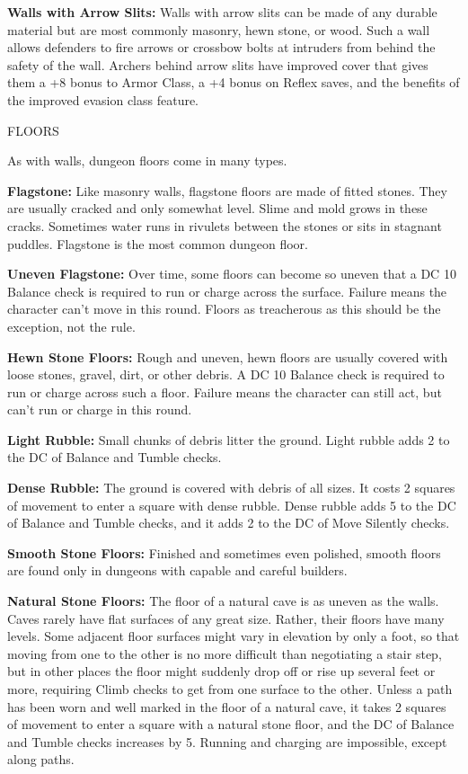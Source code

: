 \documentclass{article}
\begin{document}
\textbf{Walls with Arrow Slits: }Walls with arrow slits can be made of any durable 
material but are most commonly masonry, hewn stone, or wood. Such a wall allows 
defenders to fire arrows or crossbow bolts at intruders from behind the safety 
of the wall. Archers behind arrow slits have improved cover that gives them a +8 
bonus to Armor Class, a +4 bonus on Reflex saves, and the benefits of the improved 
evasion class feature.

\vspace{12pt}
FLOORS

As with walls, dungeon floors come in many types.

\textbf{Flagstone: }Like masonry walls, flagstone floors are made of fitted stones. 
They are usually cracked and only somewhat level. Slime and mold grows in these 
cracks. Sometimes water runs in rivulets between the stones or sits in stagnant 
puddles. Flagstone is the most common dungeon floor.

\textbf{Uneven Flagstone:} Over time, some floors can become so uneven that a DC 
10 Balance check is required to run or charge across the surface. Failure means 
the character can't move in this round. Floors as treacherous as this should be 
the exception, not the rule.

\textbf{Hewn Stone Floors:} Rough and uneven, hewn floors are usually covered with 
loose stones, gravel, dirt, or other debris. A DC 10 Balance check is required 
to run or charge across such a floor. Failure means the character can still act, 
but can't run or charge in this round.

\textbf{Light Rubble: }Small chunks of debris litter the ground. Light rubble adds 
2 to the DC of Balance and Tumble checks.

\textbf{Dense Rubble:} The ground is covered with debris of all sizes. It costs 
2 squares of movement to enter a square with dense rubble. Dense rubble adds 5 
to the DC of Balance and Tumble checks, and it adds 2 to the DC of Move Silently 
checks.

\textbf{Smooth Stone Floors:} Finished and sometimes even polished, smooth floors 
are found only in dungeons with capable and careful builders. 

\textbf{Natural Stone Floors:} The floor of a natural cave is as uneven as the 
walls. Caves rarely have flat surfaces of any great size. Rather, their floors 
have many levels. Some adjacent floor surfaces might vary in elevation by only 
a foot, so that moving from one to the other is no more difficult than negotiating 
a stair step, but in other places the floor might suddenly drop off or rise up 
several feet or more, requiring Climb checks to get from one surface to the other. 
Unless a path has been worn and well marked in the floor of a natural cave, it 
takes 2 squares of movement to enter a square with a natural stone floor, and the 
DC of Balance and Tumble checks increases by 5. Running and charging are impossible, 
except along paths.
\end{document}
